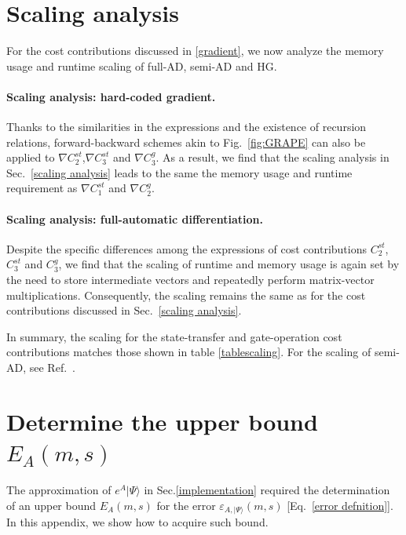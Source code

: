 \documentclass[letterpaper,10pt]{iopart}
\newcommand{\dket}[1]{|#1\rangle}
\begin{document}
\section{Scaling analysis}
\label{scaling analysis for other cost contributions}
For the cost contributions discussed in \ref{gradient},
we now analyze the memory usage and runtime scaling of full-AD, semi-AD and HG.
\paragraph{Scaling analysis: hard-coded gradient.}
Thanks to the similarities in the expressions and the existence of recursion relations, forward-backward schemes akin to Fig.\ \ref{fig:GRAPE} 
can also be applied to $\nabla C_2^{st}$,$\nabla C_3^{st}$ and $\nabla C_3^{g}$. As a result, we find that the scaling analysis in Sec.\ \ref{scaling analysis} leads to the same the memory usage and runtime requirement as $\nabla C_1^{st}$ and $\nabla C_2^{g}$.



\paragraph{Scaling analysis: full-automatic differentiation.}
Despite the specific differences among the expressions of cost contributions $C_2^{st}$, $C_3^{st}$ and $C_3^{g}$, we find that the scaling of runtime and memory usage is again set by the need to store intermediate vectors and repeatedly perform matrix-vector multiplications. Consequently, the scaling remains the same as for the cost contributions discussed in Sec.\ \ref{scaling analysis}.

In summary, the scaling for the state-transfer and gate-operation cost contributions matches those shown in table \ref{tablescaling}. For the scaling of semi-AD, see Ref.\ \cite{semiadgoerz2022quantum}.

\section{Determine the upper bound $E_A(m,s)$}
\label{errorupperbound}
The approximation of $e^A\dket{\Psi}$ in Sec.\ref{implementation} required the determination of an upper bound $E_A(m,s)$ for the error $\varepsilon_{A,\dket{\Psi}}(m,s)$ [Eq.\ \eqref{error defnition}]. In this appendix, we show how to acquire such bound.
\end{document}
